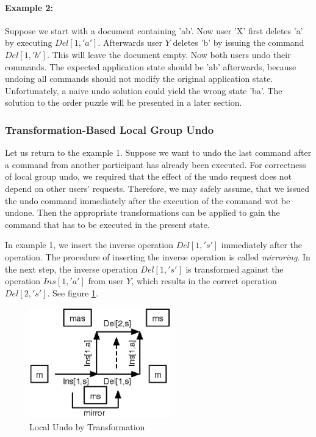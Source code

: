 \paragraph{Example 2:}
Suppose we start with a document containing 'ab'. Now user 'X' first deletes 'a' by executing $Del[1,'a']$. Afterwards user $Y$ deletes 'b' by issuing the command $Del[1,'b']$. This will leave the document empty. Now both users undo their commands. The expected application state should be 'ab' afterwards, because undoing all commands should not modify the original application state. Unfortunately, a naive undo solution could yield the wrong state 'ba'. The solution to the order puzzle will be presented in a later section.

\subsubsection{Transformation-Based Local Group Undo}
Let us return to the example 1. Suppose we want to undo the last command after a command from another participant has already been executed. For correctness of local group undo, we required that the effect of the undo request does not depend on other users' requests. Therefore, we may safely assume, that we issued the undo command immediately after the execution of the command wot be undone. Then the appropriate transformations can be applied to gain the command that has to be executed in the present state. 

In example 1, we insert the inverse operation $Del[1,'s']$ immediately after the operation. The procedure of inserting the inverse operation is called \emph{mirroring}. In the next step, the inverse operation $Del[1,'s']$ is transformed against the operation $Ins[1,'a']$ from user $Y$, which results in the correct operation $Del[2,'s']$. See figure \ref{fig:concepts.undobytransformation}.

\begin{figure}[htb]
 \centering
 \includegraphics[width=6.13cm,height=4.79cm]{../../images/concepts_undobytransformation.eps}
 \caption{Local Undo by Transformation}
 \label{fig:concepts.undobytransformation}
\end{figure}

